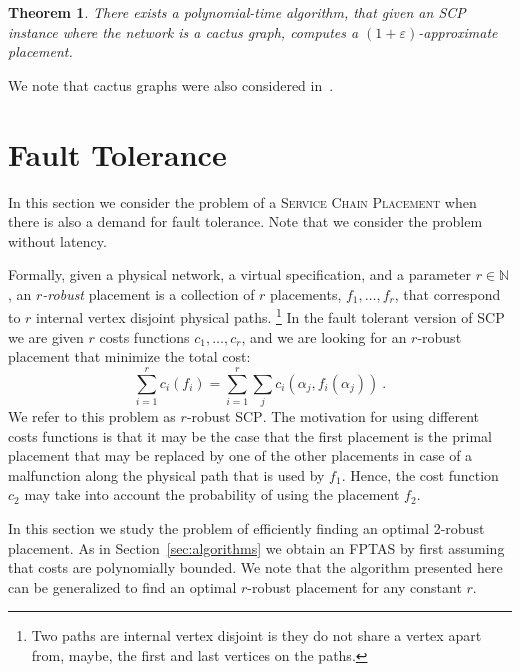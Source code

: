 \documentclass[11pt]{article}
\newtheorem{theorem}{Theorem}
\newcommand{\naturals}{\mathbb{N}}
\newcommand{\eps}{\varepsilon}
\newcommand{\scp}{\textsc{SCP}\xspace}
\begin{document}
\begin{theorem}
There exists a polynomial-time algorithm, that given an \scp instance
where the network is a cactus graph, computes a $(1+\eps)$-approximate
placement.
\end{theorem}

We note that cactus graphs were also considered in~\cite{FPS17}.


\section{Fault Tolerance}

In this section we consider the problem of a \textsc{Service Chain
  Placement} when there is also a demand for fault tolerance.  Note
that we consider the problem without latency.

Formally, given a physical network, a virtual specification, and a
parameter $r \in \naturals$, an \emph{$r$-robust} placement is a
collection of $r$ placements, $f_1,\ldots,f_r$, that correspond to $r$
internal vertex disjoint physical paths.%
\footnote{Two paths are internal vertex disjoint is they do not share
  a vertex apart from, maybe, the first and last vertices on the
  paths.}
%
In the fault tolerant
version of \scp we are given $r$ costs functions $c_1,\ldots,c_r$, and
we are looking for an $r$-robust placement that minimize the total
cost:
\[
\sum_{i=1}^r c_i(f_i) = \sum_{i = 1}^r \sum_j c_i(\alpha_j,f_i(\alpha_j))
~.
\]
We refer to this problem as $r$-robust \scp.
%
The motivation for using different costs functions is that it may be
the case that the first placement is the primal placement that may be
replaced by one of the other placements in case of a malfunction along
the physical path that is used by $f_1$.  Hence, the cost function
$c_2$ may take into account the probability of using the placement
$f_2$.

In this section we study the problem of efficiently finding an optimal
2-robust placement.  As in Section~\ref{sec:algorithms} we obtain an
FPTAS by first assuming that costs are polynomially bounded.  We note
that the algorithm presented here can be generalized to find an
optimal $r$-robust placement for any constant $r$.
\end{document}
